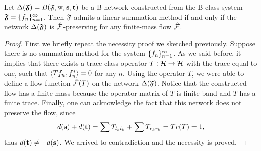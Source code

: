 \documentclass[12pt]{amsart}
\begin{document}
    \begin{theorem}
      \label{thm-graph-eq}
        Let $\net(\fsys) = B(\fsys, \wtp, \source, \sink)$ be a B-network constructed
          from the B-class system $\fsys = \seq{f}$.
        Then $\fsys$ admits a linear summation method if and only if
          the network $\net(\fsys)$ is $\flow$-preserving for any
          finite-mass flow $\flow$.
    \end{theorem}
    \begin{proof}
      First we briefly repeat the necessity proof we sketched previously.
      Suppose there is no summation method for the system $\seq{f}$.
      As we said before, it implies that there exists a trace class operator $T : \cal{H} \to \cal{H}$ with
      the trace equal to one, such that $\inner{Tf_n}{f_n^*} = 0$ for any $n$.
      Using the operator $T$, we were able to define a flow function $\flow(T)$ on the network
      $\net(\fsys)$.
      Notice that the constructed flow has a finite mass because the operator matrix of $T$ is finite-band and $T$ has a finite trace.
      Finally, one can acknowledge the fact that this network does not preserve the flow, since
      \[
        d(\source) + d(\sink) = \sum T_{l_k l_k} + \sum T_{r_k r_k} = Tr(T) = 1,
      \]
      thus $d(\sink) \neq -d(\source)$.
      We arrived to contradiction and the necessity is proved.


\end{proof}
\end{document}
